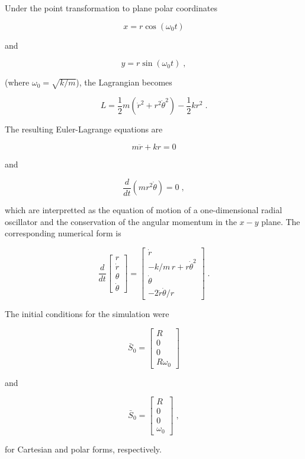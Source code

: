 \documentclass[12pt]{article}
\begin{document}
Under the point transformation to plane polar coordinates

\[ x = r \cos ( \omega_0 t) \]

and

\[ y = r \sin ( \omega_0 t) \; ,\] 

(where $\omega_0 = \sqrt{k/m}$), the Lagrangian becomes 

\[ L = \frac{1}{2} m \left( {\dot r}^2 + r^2 {\dot \theta}^2 \right) - \frac{1}{2} k r^2 \; .\]

The resulting Euler-Lagrange equations are 

\[ m \ddot r + k r = 0 \]

and

\[ \frac{d}{dt} \left( m r^2 \dot \theta \right) = 0 \; , \]

which are interpretted as the equation of motion of a one-dimensional radial oscillator and the conservation of the angular momentum in the $x-y$ plane.   The corresponding numerical form is

\[ \frac{d}{dt} \left[ \begin{array}{c} r \\ \dot r \\ \theta \\ \dot \theta \end{array} \right] = \left[ \begin{array}{c} \dot r \\ - k/m \, r + r \dot \theta^2  \\ \dot \theta \\ -2 \dot r \dot \theta /r \end{array} \right] \; . \]

The initial conditions for the simulation were 

\[ {\bar S}_0 = \left[ \begin{array}{c} R \\ 0 \\ 0\\ R \omega_0 \end{array} \right] \]

and

\[ {\bar S}_0 = \left[ \begin{array}{c} R \\ 0 \\ 0\\ \omega_0 \end{array} \right] \; ,\]

for Cartesian and polar forms, respectively.
\end{document}
